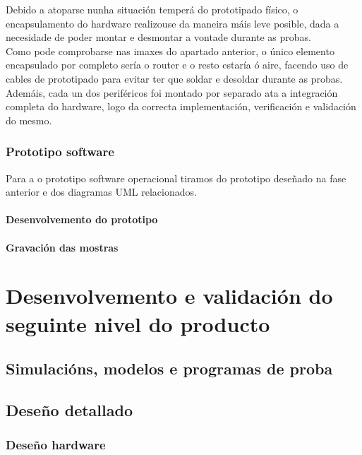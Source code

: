   Debido a atoparse nunha situación temperá do prototipado físico, o
   encapsulamento do hardware realizouse da maneira máis leve posible, dada a
   necesidade de poder montar e desmontar a vontade durante as probas. \\
   
   Como pode comprobarse nas imaxes do apartado anterior, o único elemento
   encapsulado por completo sería o router e o resto estaría ó aire, facendo uso
   de cables de prototipado para evitar ter que soldar e desoldar durante as
   probas. \\
   
   Ademáis, cada un dos periféricos foi montado por separado ata a integración
   completa do hardware, logo da correcta implementación, verificación e
   validación do mesmo.

  \subsubsection{Prototipo software}
  
  Para a o prototipo software operacional tiramos do prototipo deseñado na fase
  anterior e dos diagramas UML relacionados.

   \paragraph{Desenvolvemento do prototipo}

   \paragraph{Gravación das mostras}

\section{Desenvolvemento e validación do seguinte nivel do producto}

 \subsection{Simulacións, modelos e programas de proba}

 \subsection{Deseño detallado}

  \subsubsection{Deseño hardware}

